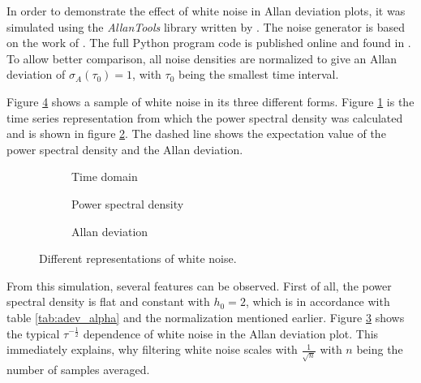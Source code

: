 In order to demonstrate the effect of white noise in Allan deviation plots, it was simulated using the \textit{AllanTools} library written by \citeauthor{allantools} \cite{allantools}. The noise generator is based on the work of \citeauthor{noise_generation} \cite{noise_generation}. The full Python program code is published online \cite{supplemental_material} and found in . To allow better comparison, all noise densities are normalized to give an Allan deviation of $\sigma_A(\tau_0)=1$, with $\tau_0$ being the smallest time interval.

Figure \ref{fig:white_noise_simulated} shows a sample of white noise in its three different forms. Figure \ref{fig:white_noise_time} is the time series representation from which the power spectral density was calculated and is shown in figure \ref{fig:white_noise_psd}. The dashed line shows the expectation value of the power spectral density and the Allan deviation.

\begin{figure}[ht]
    \centering
    \begin{subfigure}{0.32\linewidth}
        \centering
        \scalebox{0.75}{%
            
        } %
        \caption{Time domain}
        \label{fig:white_noise_time}
    \end{subfigure}
    \hfill
    \begin{subfigure}{0.32\linewidth}
        \centering
        \scalebox{0.75}{%
            
        } %
        \caption{Power spectral density}
        \label{fig:white_noise_psd}
    \end{subfigure}
    \hfill
    \begin{subfigure}{0.32\linewidth}
        \centering
        \scalebox{0.75}{%
            
        } %
        \caption{Allan deviation}
        \label{fig:white_noise_adev}
    \end{subfigure}
    \caption{Different representations of white noise.}
    \label{fig:white_noise_simulated}
\end{figure}

From this simulation, several features can be observed. First of all, the power spectral density is flat and constant with $h_0 = 2$, which is in accordance with table \ref{tab:adev_alpha} and the normalization mentioned earlier. Figure \ref{fig:white_noise_adev} shows the typical $\tau^{-\frac 1 2}$ dependence of white noise in the Allan deviation plot. This immediately explains, why filtering white noise scales with $\frac{1}{\sqrt{n}}$ with $n$ being the number of samples averaged.

